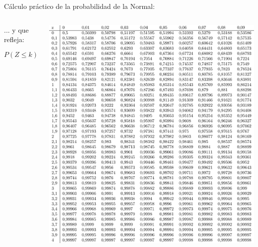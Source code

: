 \documentclass[11pt]{beamer}
\begin{document}
\begin{frame}{Cálculo práctico de la probabilidad de la Normal:}
\begin{columns}
\begin{column}{0.6\textwidth}
\begin{block}{}
... y que refleja:

$$P\left(Z\leq k \right), \ \  k \in \left[ 0 , 4'09 \right]$$
\begin{center}
    
\end{center}
\end{block}
\end{column}
\begin{column}{0.4\textwidth}
\includegraphics[page=1,width=1\textwidth]{probabilidad/distribucion_normal}
\end{column}
\end{columns}


\end{frame}
\end{document}
